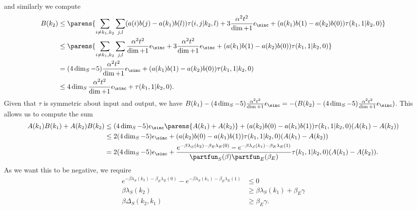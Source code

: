     and similarly we compute
    \begin{align}
        B(k_2) &\leq  \parens{\sum_{i \neq k_1, k_2} \sum_{j,l} (a(i) b(j) - a(k_1) b(l)) \tau(i,j|k_2, l) + 3 \frac{\alpha^2 t^2}{\dim + 1}\epsilon_{\sinc} + (a(k_1) b(1) - a(k_2) b(0)) \tau(k_1, 1 | k_2, 0)} \\
        &\leq \parens{\sum_{i \neq k_1, k_2} \sum_{j,l} \frac{\alpha^2 t^2}{\dim + 1} \epsilon_{\sinc} + 3 \frac{\alpha^2 t^2}{\dim + 1} \epsilon_{\sinc} + (a(k_1) b(1) - a(k_2) b(0)) \tau(k_1, 1 | k_2, 0)} \\
        &= (4 \dim_S - 5) \frac{\alpha^2 t^2}{\dim + 1} \epsilon_{\sinc} + (a(k_1) b(1) - a(k_2) b(0)) \tau(k_1, 1 | k_2, 0) \\
        &\leq 4 \dim_S \frac{\alpha^2 t^2}{\dim + 1} \epsilon_{\sinc} + \tau(k_1, 1| k_2, 0).
    \end{align}
    Given that $\tau$ is symmetric about input and output, we have $B(k_1) - (4 \dim_S - 5) \frac{\alpha^2 t^2}{\dim + 1} \epsilon_{\sinc} = - (B(k_2) - (4\dim_S - 5) \frac{\alpha^2 t^2}{\dim + 1} \epsilon_{\sinc})$. This allows us to compute the sum
    \begin{align}
        A(k_1) B(k_1) + A(k_2) B(k_2) &\leq (4 \dim_S - 5) \epsilon_{\sinc} \parens{A(k_1) + A(k_2)} + (a(k_2) b(0) - a(k_1) b(1)) \tau(k_1, 1| k_2, 0) (A(k_1) - A(k_2)) \\
        &\leq 2 (4 \dim_S - 5) \epsilon_{\sinc} + (a(k_2) b(0) - a(k_1) b(1)) \tau(k_1, 1| k_2, 0) (A(k_1) - A(k_2)) \\
        &= 2 (4 \dim_S - 5) \epsilon_{\sinc} + \frac{e^{-\beta \lambda_S(k_2) - \beta_E \lambda_E(0)} - e^{-\beta \lambda_S(k_1) - \beta_E \lambda_E(1)}}{\partfun_S(\beta) \partfun_E(\beta_E)} \tau(k_1, 1| k_2, 0) (A(k_1) - A(k_2)).
    \end{align}
    As we want this to be negative, we require
    \begin{align}
        e^{-\beta \lambda_S(k_2) - \beta_E \lambda_E(0)} - e^{-\beta \lambda_S(k_1) - \beta_E \lambda_E(1)} &\leq 0 \\
        \beta \lambda_S(k_2) &\geq \beta \lambda_S(k_1) + \beta_E\gamma \\
        \beta \Delta_S(k_2, k_1) &\geq \beta_E \gamma.
    \end{align}
    
